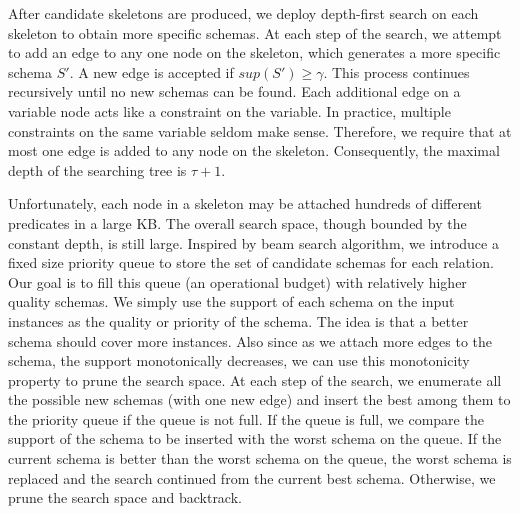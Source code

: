 After candidate skeletons are produced, we deploy depth-first search on
each skeleton to obtain more specific schemas.
At each step of the search, we attempt to add an edge to any one node
on the skeleton, which generates a more specific schema $S'$.
A new edge is accepted if $sup(S') \ge \gamma$.
This process continues recursively until
no new schemas can be found.
Each additional edge on a variable node acts like a constraint on the variable.
In practice, multiple constraints on the same variable seldom make sense. 
Therefore, we require that at most one edge is added to any node 
on the skeleton.
Consequently, the maximal depth of the searching tree is $\tau+1$.

Unfortunately, each node in a skeleton may be attached hundreds of
different predicates in a large KB. The overall search space, though
bounded by the constant depth, is still large.
Inspired by beam search algorithm\cite{ney1992improvements}, 
we introduce a fixed size 
priority queue to store the set of candidate schemas for each relation.
Our goal is to fill this queue (an operational budget) 
with relatively higher quality
schemas. We simply use the support of each schema on the input instances
as the quality or priority of the schema. The idea is that a better schema
should cover more instances. Also since as we attach more edges to the schema,
the support monotonically decreases, we can use this 
monotonicity property to prune the search
space. At each step of the search, we enumerate all the possible new schemas
(with one new edge) and insert the best among them to the priority queue if the
queue is not full. If the queue is full, we compare the support of the 
schema to be inserted with the worst schema on the queue. 
If the current schema is better than the worst schema on the queue, 
the worst schema is replaced and
the search continued from the current best schema. 
Otherwise, we prune the search space and backtrack.

